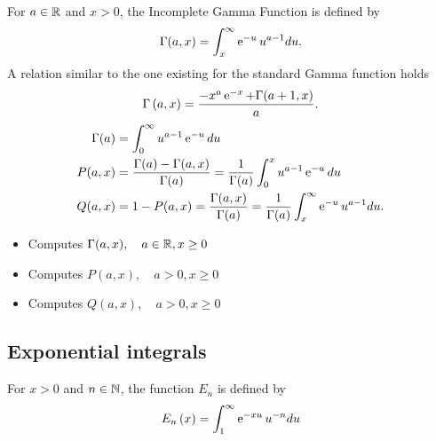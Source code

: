For $a \in {\mathbb R}$ and $x>0$, the Incomplete Gamma Function is defined by
\begin{equation*}
  \Gamma(a, x)=\int_x^{\infty} \operatorname{e}^{ -u } u^{a-1} du.
\end{equation*}
A relation similar to the one existing for the standard Gamma function holds
\begin{equation*}
  \Gamma\left( a, x \right)= \frac{- x^{a} \operatorname{e}^{ -x } + \Gamma (a+1, x)}{a}.
\end{equation*}
\begin{align*}
  \Gamma(a)&=\int_0^{\infty} u^{a-1} \operatorname{e}^{ -u }du\\ 
  P(a, x) &= \frac{\Gamma(a) - \Gamma(a, x)}{\Gamma(a)} =
  \frac{1}{\Gamma(a)} \int_0^x u^{a-1} \operatorname{e}^{ -u }  du\\ 
  Q(a, x) &= 1-P(a, x) =\frac{\Gamma(a, x)}{\Gamma(a)} =
  \frac{1}{\Gamma(a)} \int_x^{\infty} \operatorname{e}^{ -u } u^{a-1} du. 
\end{align*}

\begin{itemize}
\item {}
  \sshortdescribe   Computes $\Gamma(a, x), \quad a \in {\mathbb R} , x \geq 0$
\item {}
  \sshortdescribe  Computes $P(a, x), \quad a > 0 , x \geq 0$
\item {}
  \sshortdescribe  Computes $Q(a, x), \quad a > 0 , x \geq 0$
\end{itemize}

\subsection{Exponential integrals}
For $x>0$ and $n \in {\mathbb N}$, the  function $E_n$ is defined by
\begin{equation*}
  E_n\left( x \right)=\int_{1}^{\infty} \operatorname{e}^{ -x u } u^{-n} du
\end{equation*}

